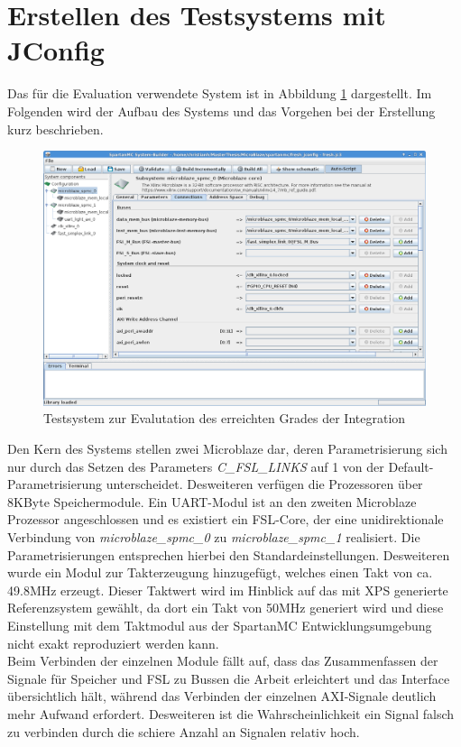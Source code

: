\section{Erstellen des Testsystems mit JConfig}
Das für die Evaluation verwendete System ist in Abbildung \ref{fig:Testsystem} dargestellt. Im Folgenden wird der Aufbau des Systems und das Vorgehen bei der Erstellung kurz beschrieben.
\begin{figure}[th!]
	\centering
	\includegraphics[width=1\linewidth]{./bilder/Testsystem}
	\caption{Testsystem zur Evalutation des erreichten Grades der Integration}
	\label{fig:Testsystem}
\end{figure}
Den Kern des Systems stellen zwei Microblaze dar, deren Parametrisierung sich nur durch das Setzen des Parameters \textit{C\_FSL\_LINKS} auf 1 von der Default-Parametrisierung unterscheidet. Desweiteren verfügen die Prozessoren über 8KByte Speichermodule. Ein UART-Modul ist an den zweiten Microblaze Prozessor angeschlossen und es existiert ein FSL-Core, der eine unidirektionale Verbindung von \textit{microblaze\_spmc\_0} zu \textit{microblaze\_spmc\_1} realisiert. Die Parametrisierungen entsprechen hierbei den Standardeinstellungen. Desweiteren wurde ein Modul zur Takterzeugung hinzugefügt, welches einen Takt von ca. 49.8MHz erzeugt. Dieser Taktwert wird im Hinblick auf das mit XPS generierte Referenzsystem gewählt, da  dort ein Takt von 50MHz generiert wird und diese Einstellung mit dem Taktmodul aus der SpartanMC Entwicklungsumgebung nicht exakt reproduziert werden kann.\\
Beim Verbinden der einzelnen Module fällt auf, dass das Zusammenfassen der Signale für Speicher und FSL zu Bussen die Arbeit erleichtert und das Interface übersichtlich hält, während das Verbinden der einzelnen AXI-Signale deutlich mehr Aufwand erfordert. Desweiteren ist die Wahrscheinlichkeit ein Signal falsch zu verbinden durch die schiere Anzahl an Signalen relativ hoch.\\

